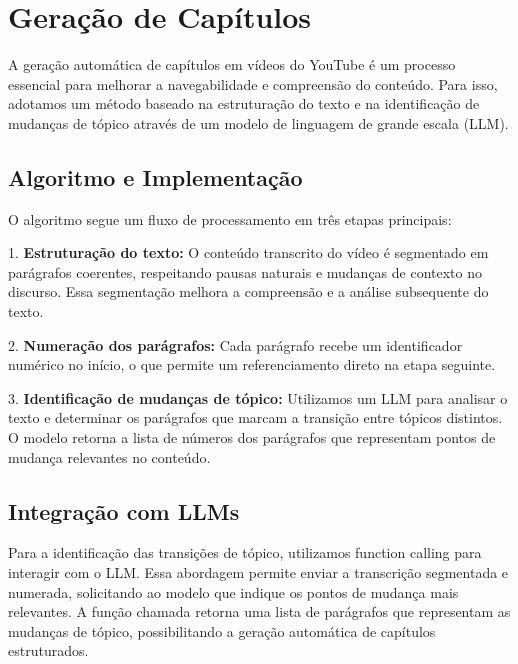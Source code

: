 \documentclass[tcc,capa]{texufpel}
\begin{document}
\section{Gera\c{c}\~{a}o de Cap\'{i}tulos}

A gera\c{c}\~{a}o autom\'atica de cap\'{i}tulos em v\'{i}deos do YouTube \'{e} um processo essencial para melhorar a navegabilidade e compreens\~{a}o do conte\'udo. Para isso, adotamos um m\'etodo baseado na estrutura\c{c}\~{a}o do texto e na identifica\c{c}\~{a}o de mudan\c{c}as de t\'opico atrav\'es de um modelo de linguagem de grande escala (LLM).

\subsection{Algoritmo e Implementa\c{c}\~{a}o}

O algoritmo segue um fluxo de processamento em tr\^{e}s etapas principais:

1. \textbf{Estrutura\c{c}\~{a}o do texto:} O conte\'udo transcrito do v\'{i}deo \'{e} segmentado em par\'{a}grafos coerentes, respeitando pausas naturais e mudan\c{c}as de contexto no discurso. Essa segmenta\c{c}\~{a}o melhora a compreens\~{a}o e a an\'{a}lise subsequente do texto.

2. \textbf{Numera\c{c}\~{a}o dos par\'{a}grafos:} Cada par\'{a}grafo recebe um identificador num\'erico no in\'{i}cio, o que permite um referenciamento direto na etapa seguinte.

3. \textbf{Identifica\c{c}\~{a}o de mudan\c{c}as de t\'opico:} Utilizamos um LLM para analisar o texto e determinar os par\'{a}grafos que marcam a transi\c{c}\~{a}o entre t\'opicos distintos. O modelo retorna a lista de n\'{u}meros dos par\'{a}grafos que representam pontos de mudan\c{c}a relevantes no conte\'udo.

\subsection{Integra\c{c}\~{a}o com LLMs}

Para a identifica\c{c}\~{a}o das transi\c{c}\~{o}es de t\'opico, utilizamos function calling para interagir com o LLM. Essa abordagem permite enviar a transcri\c{c}\~{a}o segmentada e numerada, solicitando ao modelo que indique os pontos de mudan\c{c}a mais relevantes. A fun\c{c}\~{a}o chamada retorna uma lista de par\'{a}grafos que representam as mudan\c{c}as de t\'opico, possibilitando a gera\c{c}\~{a}o autom\'atica de cap\'{i}tulos estruturados.
\end{document}
